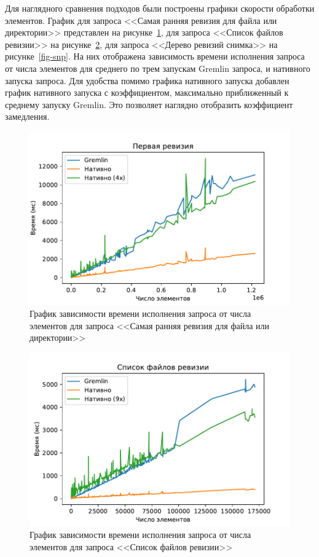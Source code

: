 \documentclass[times,specification,annotation]{itmo-student-thesis}
\begin{document}
Для наглядного сравнения подходов были построены графики скорости обработки элементов. График для запроса <<Самая ранняя ревизия для файла или директории>> представлен на рисунке~\ref{fig-ecr}, для запроса <<Список файлов ревизии>> на рисунке~\ref{fig-rec}, для запроса <<Дерево ревизий снимка>> на рисунке~\ref{fig-snp}. На них отображена зависимость времени исполнения запроса от числа элементов для среднего по трем запускам Gremlin запроса, и нативного запуска запроса. Для удобства помимо графика нативного запуска добавлен график нативного запуска с коэффициентом, максимально приближенный к среднему запуску Gremlin. Это позволяет наглядно отобразить коэффициент замедления.

\begin{figure}[!h]
\caption{График зависимости времени исполнения запроса от числа элементов для запроса <<Самая ранняя ревизия для файла или директории>>}\label{fig-ecr}
\centering
\includegraphics{img/ecr-plot.pdf}
\end{figure}

\begin{figure}[!h]
\caption{График зависимости времени исполнения запроса от числа элементов для запроса <<Список файлов ревизии>>}\label{fig-rec}
\centering
\includegraphics{img/rec-plot.pdf}
\end{figure}
\end{document}
